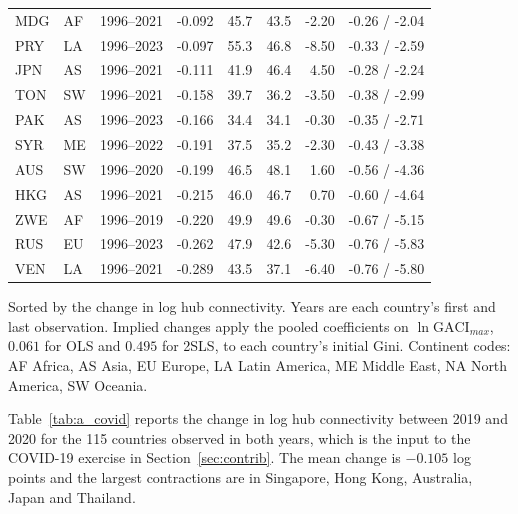 \begin{table}[H]
\begin{threeparttable}
\begin{tabular}{llrrrrrr}
MDG & AF & 1996--2021 & -0.092 & 45.7 & 43.5 & -2.20 & -0.26 / -2.04 \\
PRY & LA & 1996--2023 & -0.097 & 55.3 & 46.8 & -8.50 & -0.33 / -2.59 \\
JPN & AS & 1996--2021 & -0.111 & 41.9 & 46.4 & 4.50 & -0.28 / -2.24 \\
TON & SW & 1996--2021 & -0.158 & 39.7 & 36.2 & -3.50 & -0.38 / -2.99 \\
PAK & AS & 1996--2023 & -0.166 & 34.4 & 34.1 & -0.30 & -0.35 / -2.71 \\
SYR & ME & 1996--2022 & -0.191 & 37.5 & 35.2 & -2.30 & -0.43 / -3.38 \\
AUS & SW & 1996--2020 & -0.199 & 46.5 & 48.1 & 1.60 & -0.56 / -4.36 \\
HKG & AS & 1996--2021 & -0.215 & 46.0 & 46.7 & 0.70 & -0.60 / -4.64 \\
ZWE & AF & 1996--2019 & -0.220 & 49.9 & 49.6 & -0.30 & -0.67 / -5.15 \\
RUS & EU & 1996--2023 & -0.262 & 47.9 & 42.6 & -5.30 & -0.76 / -5.83 \\
VEN & LA & 1996--2021 & -0.289 & 43.5 & 37.1 & -6.40 & -0.76 / -5.80 \\
\bottomrule
\end{tabular}
\begin{tablenotes}\scriptsize\item Sorted by the change in log hub connectivity. Years are each country's first and last observation. Implied changes apply the pooled coefficients on $\ln\mathrm{GACI}_{max}$, $0.061$ for OLS and $0.495$ for 2SLS, to each country's initial Gini. Continent codes: AF Africa, AS Asia, EU Europe, LA Latin America, ME Middle East, NA North America, SW Oceania.\end{tablenotes}\end{threeparttable}\end{table}

Table~\ref{tab:a_covid} reports the change in log hub connectivity between 2019 and 2020 for the 115 countries observed in both years, which is the input to the COVID-19 exercise in Section~\ref{sec:contrib}. The mean change is $-0.105$ log points and the largest contractions are in Singapore, Hong Kong, Australia, Japan and Thailand.

